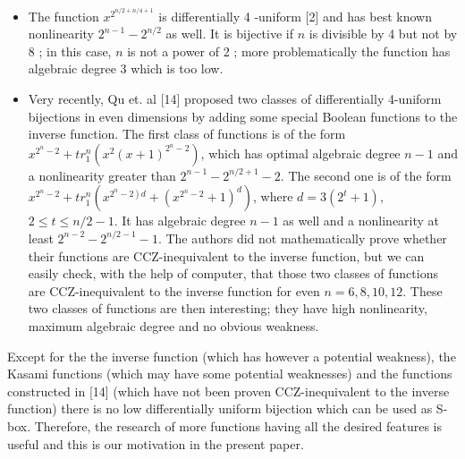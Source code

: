 \documentclass[10pt]{article}
\begin{document}
\begin{itemize}
  \item The function $x^{2^{n / 2+n / 4+1}}$ is differentially 4 -uniform [2] and has best known nonlinearity $2^{n-1}-2^{n / 2}$ as well. It is bijective if $n$ is divisible by 4 but not by 8 ; in this case, $n$ is not a power of 2 ; more problematically the function has algebraic degree 3 which is too low.
  \item Very recently, Qu et. al [14] proposed two classes of differentially 4-uniform bijections in even dimensions by adding some special Boolean functions to the inverse function. The first class of functions is of the form $x^{2^{n}-2}+t r_{1}^{n}\left(x^{2}(x+1)^{2^{n}-2}\right)$, which has optimal algebraic degree $n-1$ and a nonlinearity greater than $2^{n-1}-2^{n / 2+1}-2$. The second one is of the form $x^{2^{n}-2}+t r_{1}^{n}\left(x^{\left.2^{n}-2\right) d}+\left(x^{2^{n}-2}+1\right)^{d}\right)$, where $d=3\left(2^{t}+1\right)$, $2 \leq t \leq n / 2-1$. It has algebraic degree $n-1$ as well and a nonlinearity at least $2^{n-2}-2^{n / 2-1}-1$. The authors did not mathematically prove whether their functions are CCZ-inequivalent to the inverse function, but we can easily check, with the help of computer, that those two classes of functions are CCZ-inequivalent to the inverse function for even $n=6,8,10,12$. These two classes of functions are then interesting; they have high nonlinearity, maximum algebraic degree and no obvious weakness.
\end{itemize}

Except for the the inverse function (which has however a potential weakness), the Kasami functions (which may have some potential weaknesses) and the functions constructed in [14] (which have not been proven CCZ-inequivalent to the inverse function) there is no low differentially uniform bijection which can be used as S-box. Therefore, the research of more functions having all the desired features is useful and this is our motivation in the present paper.
\end{document}
